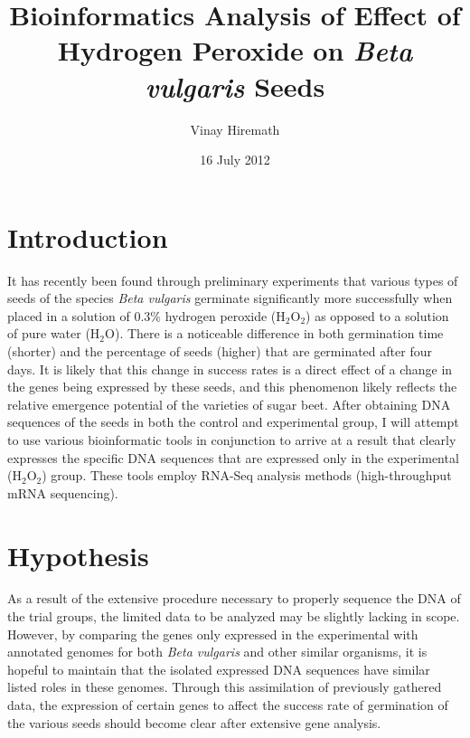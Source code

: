 \documentclass{article}
\begin{document}
\title{Bioinformatics Analysis of Effect of Hydrogen Peroxide on \emph{Beta vulgaris} Seeds}
\author{Vinay Hiremath}
\date{16 July 2012}
\maketitle
\section{Introduction}
	It has recently been found through preliminary experiments that various types of seeds of the species \emph{Beta vulgaris} germinate significantly more successfully when placed in a solution of 0.3\% hydrogen peroxide (H$_{2}$O$_{2}$) as opposed to a solution of pure water (H$_{2}$O). There is a noticeable difference in both germination time (shorter) and the percentage of seeds (higher) that are germinated after four days. It is likely that this change in success rates is a direct effect of a change in the genes being expressed by these seeds, and this phenomenon likely reflects the relative emergence potential of the varieties of sugar beet. After obtaining DNA sequences of the seeds in both the control and experimental group, I will attempt to use various bioinformatic tools in conjunction to arrive at a result that clearly expresses the specific DNA sequences that are expressed only in the experimental (H$_{2}$O$_{2}$) group. These tools employ RNA-Seq analysis methods (high-throughput mRNA sequencing).
\section{Hypothesis}
	As a result of the extensive procedure necessary to properly sequence the DNA of the trial groups, the limited data to be analyzed may be slightly lacking in scope. However, by comparing the genes only expressed in the experimental with annotated genomes for both \emph{Beta vulgaris} and other similar organisms, it is hopeful to maintain that the isolated expressed DNA sequences have similar listed roles in these genomes. Through this assimilation of previously gathered data, the expression of certain genes to affect the success rate of germination of the various seeds should become clear after extensive gene analysis.
\end{document}
